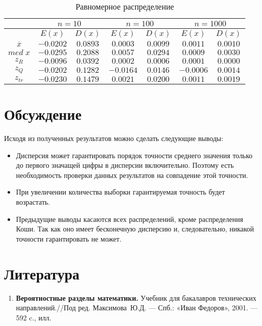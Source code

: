 \documentclass[12pt,a4paper]{article}
\begin{document}
\begin{center}
		\begin{table}[h]
			\caption{Равномерное распределение}
			\begin{center}
				\begin{tabular}{|c|c|c|c|c|c|c|}
					\hline
					& \multicolumn{2}{c|}{$n=10$} & \multicolumn{2}{c|}{$n=100$} & \multicolumn{2}{c|}{$n=1000$}\\
					\hline
					& $E(x)$ & $D(x)$ & $E(x)$ & $D(x)$ & $E(x)$ & $D(x)$\\
					\hline
					$\overline{x}$ & $-0.0202$ & $0.0893$ & $0.0003$ & $0.0099$ & $0.0011$ & $0.0010$\\
					\hline
					$med\;x$ & $-0.0295$ & $0.2088$ & $0.0057$ & $0.0294$ & $0.0009$ & $0.0030$\\
					\hline
					$z_R$ & $-0.0096$ & $0.0392$ & $0.0002$ & $0.0006$ & $0.0001$ & $0.0000$\\
					\hline
					$z_Q$ & $-0.0202$ & $0.1282$ & $-0.0164$ & $0.0146$ & $-0.0006$ & $0.0014$\\
					\hline
					$z_{tr}$ & $-0.0230$ & $0.1479$ & $0.0021$ & $0.0200$ & $0.0011$ & $0.0019$\\
					\hline
				\end{tabular}
			\end{center}
		\end{table}
	\end{center}

	\section{Обсуждение}
	Исходя из полученных результатов можно сделать следующие выводы:
	\begin{itemize}
		\item Дисперсия может гарантировать порядок точности среднего значения только до первого значащей цифры в дисперсии включительно. Поэтому есть необходимость проверки данных результатов на совпадение этой точности.
		
		\item При увеличении количества выборки гарантируемая точность будет возрастать.
		
		\item Предыдущие выводы касаются всех распределений, кроме распределения Коши. Так как оно имеет бесконечную дисперсию и, следовательно, никакой точности гарантировать не может.
	\end{itemize}
	
	\section{Литература}
	\begin{enumerate}
		\item \label{Book_1} \textbf{Вероятностные разделы математики.} Учебник для бакалавров технических направлений.//Под ред. Максимова~Ю.Д. --- Спб.: «Иван Федоров», 2001. --- 592 c., илл.
	\end{enumerate}
\end{document}
